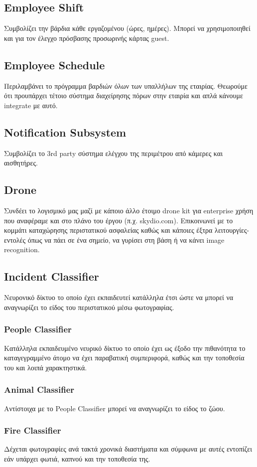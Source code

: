 \documentclass{article}
\begin{document}
\subsection{Employee Shift}
Συμβολίζει την βάρδια κάθε εργαζομένου (ώρες, ημέρες). Μπορεί να χρησιμοποιηθεί και για τον έλεγχο πρόσβασης προσωρινής κάρτας guest.

\subsection{Employee Schedule}
Περιλαμβάνει το πρόγραμμα βαρδιών όλων των υπαλλήλων της εταιρίας. Θεωρούμε ότι προυπάρχει τέτοιο σύστημα διαχείρησης πόρων στην εταιρία και απλά κάνουμε integrate με αυτό.

\subsection{Notification Subsystem}
Συμβολίζει το 3rd party σύστημα ελέγχου της περιμέτρου από κάμερες και αισθητήρες.

\subsection{Drone}
Συνδέει το λογισμικό μας μαζί με κάποιο άλλο έτοιμο drone kit για enterprise χρήση που αναφέραμε και στο πλάνο του έργου (π.χ. skydio.com). Επικοινωνεί με το κομμάτι καταχώρησης περιστατικού ασφαλείας καθώς και κάποιες έξτρα λειτουργίες-εντολές όπως να πάει σε ένα σημείο, να γυρίσει στη βάση ή να κάνει image recognition.
\subsection{Incident Classifier}
Νευρονικό δίκτυο το οποίο έχει εκπαιδευτεί κατάλληλα έτσι ώστε να μπορεί να αναγνωρίζει το είδος του περιστατικού μέσω φωτογραφίας.
\subsubsection{People Classifier}
Κατάλληλα εκπαιδευμένο νευρικό δίκτυο το οποίο έχει ως έξοδο την πιθανότητα το καταγεγραμμένο άτομο να έχει παραβατική συμπεριφορά, καθώς και την τοποθεσία του και λοιπά χαρακτηστικά.
\subsubsection{Animal Classifier}
Αντίστοιχα με το People Classifier μπορεί να αναγνωρίζει το είδος το ζώου.
\subsubsection{Fire Classifier}
Δέχεται φωτογραφίες ανά τακτά χρονικά διαστήματα και σύμφωνα με αυτές εντοπίζει εάν υπάρχει φωτιά, καπνού και την τοποθεσία της.
\end{document}

